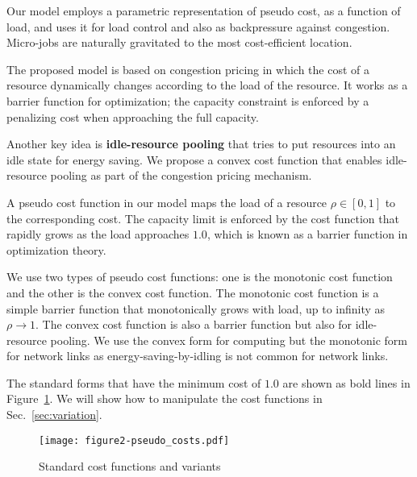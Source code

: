 
Our model employs a parametric representation of pseudo cost, as a
function of load, and uses it for load control and also as
backpressure against congestion.
Micro-jobs are naturally gravitated to the most cost-efficient
location.

The proposed model is based on congestion pricing in which the cost of
a resource dynamically changes according to the load of the resource.
It works as a barrier function for optimization; the capacity
constraint is enforced by a penalizing cost when approaching the full
capacity.

Another key idea is {\bf idle-resource pooling} that tries to put resources
into an idle state for energy saving.
We propose a convex cost function that enables idle-resource pooling
as part of the congestion pricing mechanism.

A pseudo cost function in our model maps the load of a resource
$\rho \in [0, 1]$ to the corresponding cost.
The capacity limit is enforced by the cost function that rapidly grows
as the load approaches $1.0$, which is known as a barrier function in
optimization theory.

We use two types of pseudo cost functions: one is the monotonic cost
function and the other is the convex cost function.
The monotonic cost function is a simple barrier function that
monotonically grows with load, up to infinity as $\rho \to 1$.
The convex cost function is also a barrier function but also for
idle-resource pooling.
We use the convex form for computing but the monotonic form
for network links as energy-saving-by-idling is not common for
network links.

The standard forms that have the minimum cost of $1.0$ are
shown as bold lines in Figure~\ref{fig:std_costfunc}. We will show how
to manipulate the cost functions in Sec.~\ref{sec:variation}.

\begin{figure}[tb]
  \begin{center}
    \texttt{[image: figure2-pseudo\_costs.pdf]}
    \vspace{-2.0ex}
    \caption{Standard cost functions and variants}
    \label{fig:std_costfunc}
  \end{center}
\end{figure}

